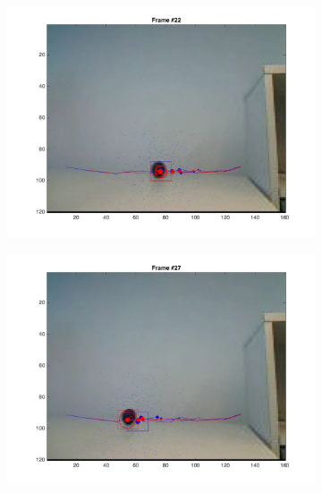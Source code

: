 \documentclass{ethz_report}
\begin{document}
\begin{figure}[h]
\begin{subfigure}[b]{.25\textwidth}
        \includegraphics[width=1\linewidth]{images/video3_particles_high_21}
    \end{subfigure}%
    \begin{subfigure}[b]{.25\textwidth}
        \centering
        \includegraphics[width=1\linewidth]{images/video3_particles_high_26}
    \end{subfigure}%
    \begin{subfigure}[b]{.25\textwidth}
        \centering

\end{subfigure}
\end{figure}
\end{document}
